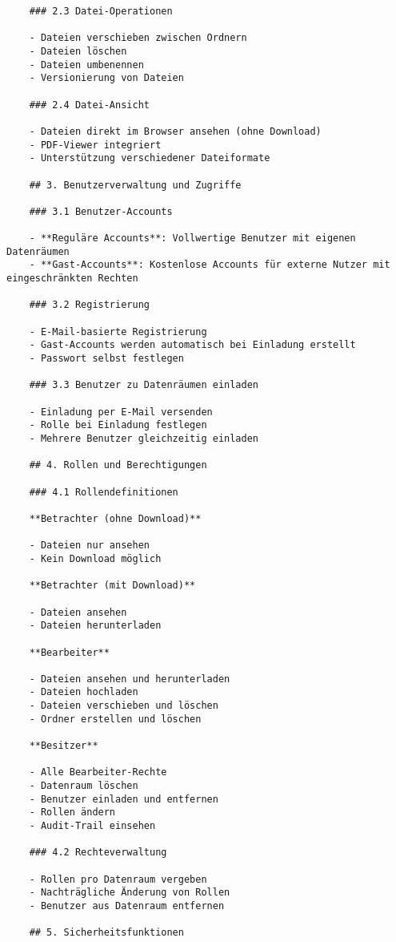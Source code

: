 \begin{verbatim}
    ### 2.3 Datei-Operationen
    
    - Dateien verschieben zwischen Ordnern
    - Dateien löschen
    - Dateien umbenennen
    - Versionierung von Dateien
    
    ### 2.4 Datei-Ansicht
    
    - Dateien direkt im Browser ansehen (ohne Download)
    - PDF-Viewer integriert
    - Unterstützung verschiedener Dateiformate
    
    ## 3. Benutzerverwaltung und Zugriffe
    
    ### 3.1 Benutzer-Accounts
    
    - **Reguläre Accounts**: Vollwertige Benutzer mit eigenen Datenräumen
    - **Gast-Accounts**: Kostenlose Accounts für externe Nutzer mit eingeschränkten Rechten
    
    ### 3.2 Registrierung
    
    - E-Mail-basierte Registrierung
    - Gast-Accounts werden automatisch bei Einladung erstellt
    - Passwort selbst festlegen
    
    ### 3.3 Benutzer zu Datenräumen einladen
    
    - Einladung per E-Mail versenden
    - Rolle bei Einladung festlegen
    - Mehrere Benutzer gleichzeitig einladen
    
    ## 4. Rollen und Berechtigungen
    
    ### 4.1 Rollendefinitionen
    
    **Betrachter (ohne Download)**
    
    - Dateien nur ansehen
    - Kein Download möglich
    
    **Betrachter (mit Download)**
    
    - Dateien ansehen
    - Dateien herunterladen
    
    **Bearbeiter**
    
    - Dateien ansehen und herunterladen
    - Dateien hochladen
    - Dateien verschieben und löschen
    - Ordner erstellen und löschen
    
    **Besitzer**
    
    - Alle Bearbeiter-Rechte
    - Datenraum löschen
    - Benutzer einladen und entfernen
    - Rollen ändern
    - Audit-Trail einsehen
    
    ### 4.2 Rechteverwaltung
    
    - Rollen pro Datenraum vergeben
    - Nachträgliche Änderung von Rollen
    - Benutzer aus Datenraum entfernen
    
    ## 5. Sicherheitsfunktionen
    

\end{verbatim}

